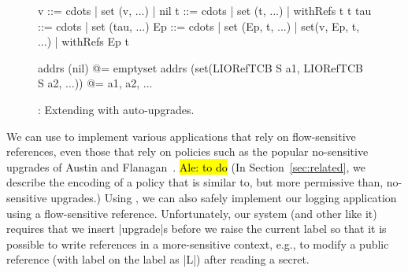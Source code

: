 \begin{figure} %
\small
\begin{code}
v    ::= cdots  | set (v, ...) | nil
t    ::= cdots  | set (t, ...) | withRefs t t
tau  ::= cdots  | set (tau, ...)
Ep   ::= cdots  | set (Ep, t, ...) | set(v, Ep, t, ...) | withRefs Ep t 

addrs (nil)                                       @= emptyset
addrs (set(LIORefTCB S a1, LIORefTCB S a2, ...))  @= {a1, a2, ...}
\end{code}
\caption{\lioafs{}: Extending \liofs{} with auto-upgrades.\label{fig:sos:afs}}
\end{figure}

We can use \liofs{} to implement various applications that rely on
flow-sensitive references, even those that rely on policies such as the
popular no-sensitive upgrades of Austin and Flanagan~\cite{Austin:Flanagan:PLAS09}.
%
\hl{Ale: to do}
(In Section~\ref{sec:related}, we describe the encoding of a policy that is
similar to, but more permissive than, no-sensitive upgrades.)
%
Using \liofs{}, we can also safely implement our logging application using a
flow-sensitive reference.
%
Unfortunately, our system (and other like it) requires that we insert
|upgrade|s before we raise the current label so that it is possible to 
write references in a more-sensitive context, e.g., to modify a public reference
(with label on the label as |L|) after reading a secret. 

